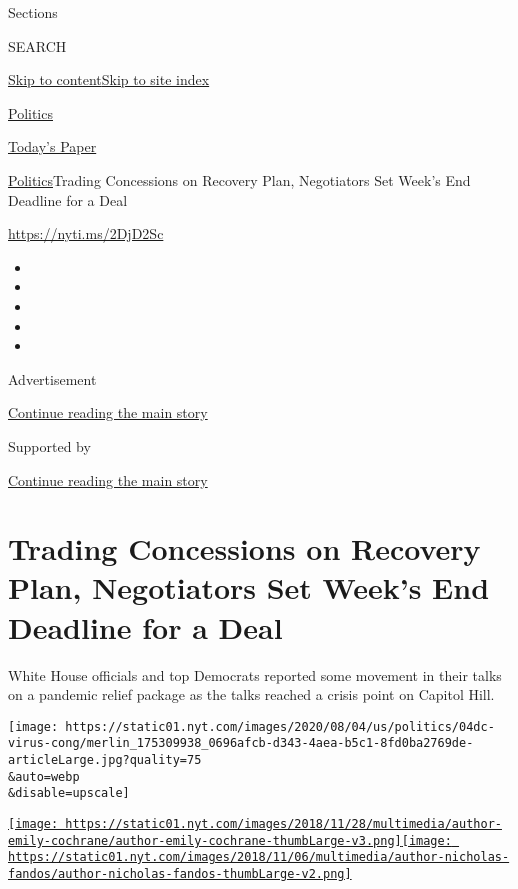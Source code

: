 Sections

SEARCH

\protect\hyperlink{site-content}{Skip to
content}\protect\hyperlink{site-index}{Skip to site index}

\href{https://www.nytimes.com/section/politics}{Politics}

\href{https://myaccount.nytimes.com/auth/login?response_type=cookie\&client_id=vi}{}

\href{https://www.nytimes.com/section/todayspaper}{Today's Paper}

\href{/section/politics}{Politics}\textbar{}Trading Concessions on
Recovery Plan, Negotiators Set Week's End Deadline for a Deal

\url{https://nyti.ms/2DjD2Sc}

\begin{itemize}
\item
\item
\item
\item
\item
\end{itemize}

Advertisement

\protect\hyperlink{after-top}{Continue reading the main story}

Supported by

\protect\hyperlink{after-sponsor}{Continue reading the main story}

\hypertarget{trading-concessions-on-recovery-plan-negotiators-set-weeks-end-deadline-for-a-deal}{%
\section{Trading Concessions on Recovery Plan, Negotiators Set Week's
End Deadline for a
Deal}\label{trading-concessions-on-recovery-plan-negotiators-set-weeks-end-deadline-for-a-deal}}

White House officials and top Democrats reported some movement in their
talks on a pandemic relief package as the talks reached a crisis point
on Capitol Hill.

\texttt{[image: https://static01.nyt.com/images/2020/08/04/us/politics/04dc-virus-cong/merlin\_175309938\_0696afcb-d343-4aea-b5c1-8fd0ba2769de-articleLarge.jpg?quality=75\\\&auto=webp\\\&disable=upscale]}

\href{https://www.nytimes.com/by/emily-cochrane}{\texttt{[image: https://static01.nyt.com/images/2018/11/28/multimedia/author-emily-cochrane/author-emily-cochrane-thumbLarge-v3.png]}}\href{https://www.nytimes.com/by/nicholas-fandos}{\texttt{[image: https://static01.nyt.com/images/2018/11/06/multimedia/author-nicholas-fandos/author-nicholas-fandos-thumbLarge-v2.png]}}

